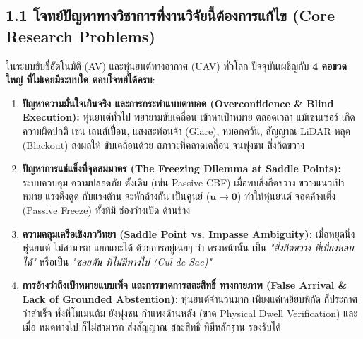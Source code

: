 \documentclass[10pt,a4paper]{article}
\begin{document}
\vspace{2pt}
\subsection*{\normalsize 1.1 โจทย์ปัญหาทางวิชาการที่งานวิจัยนี้ต้องการแก้ไข (Core Research Problems)}
\vspace{-3pt}
ในระบบขับขี่อัตโนมัติ (AV) และหุ่นยนต์ทางอากาศ (UAV) ทั่วโลก ปัจจุบันเผชิญกับ \textbf{4 คอขวดใหญ่ ที่ไม่เคยมีระบบใด ตอบโจทย์ได้ครบ}:
\begin{enumerate}[leftmargin=14pt, itemsep=1pt, topsep=1pt, parsep=0pt]
  \item \textbf{ปัญหาความมั่นใจเกินจริง และการกระทำแบบตาบอด (Overconfidence \& Blind Execution):} หุ่นยนต์ทั่วไป พยายามขับเคลื่อน เข้าหาเป้าหมาย ตลอดเวลา แม้เซนเซอร์ เกิดความผิดปกติ เช่น เลนส์เปื้อน, แสงสะท้อนจ้า (Glare), หมอกควัน, สัญญาณ LiDAR หลุด (Blackout) ส่งผลให้ ขับเคลื่อนด้วย สภาวะที่คลาดเคลื่อน จนพุ่งชน สิ่งกีดขวาง
  \item \textbf{ปัญหาการแช่แข็งที่จุดสมมาตร (The Freezing Dilemma at Saddle Points):} ระบบควบคุม ความปลอดภัย ดั้งเดิม (เช่น Passive CBF) เมื่อพบสิ่งกีดขวาง ขวางแนวเป้าหมาย แรงดึงดูด กับแรงต้าน จะหักล้างกัน เป็นศูนย์ ($\mathbf{u} \to \mathbf{0}$) ทำให้หุ่นยนต์ จอดค้างเติ่ง (Passive Freeze) ทั้งที่มี ช่องว่างเปิด ด้านข้าง
  \item \textbf{ความคลุมเครือเชิงภววิทยา (Saddle Point vs. Impasse Ambiguity):} เมื่อหยุดนิ่ง หุ่นยนต์ ไม่สามารถ แยกแยะได้ ด้วยการอยู่เฉยๆ ว่า ตรงหน้านั้น เป็น \textit{"สิ่งกีดขวาง ที่เบี่ยงหลบได้"} หรือเป็น \textit{"ซอยตัน ที่ไม่มีทางไป (Cul-de-Sac)"}
  \item \textbf{การอ้างว่าถึงเป้าหมายแบบเท็จ และการขาดการสละสิทธิ์ ทางกายภาพ (False Arrival \& Lack of Grounded Abstention):} หุ่นยนต์จำนวนมาก เพียงแค่เหยียบพิกัด ก็ประกาศว่าสำเร็จ ทั้งที่โมเมนตัม ยังพุ่งชน กำแพงด้านหลัง (ขาด Physical Dwell Verification) และเมื่อ หมดทางไป ก็ไม่สามารถ ส่งสัญญาณ สละสิทธิ์ ที่มีหลักฐาน รองรับได้
\end{enumerate}

\vspace{2pt}
\end{document}
